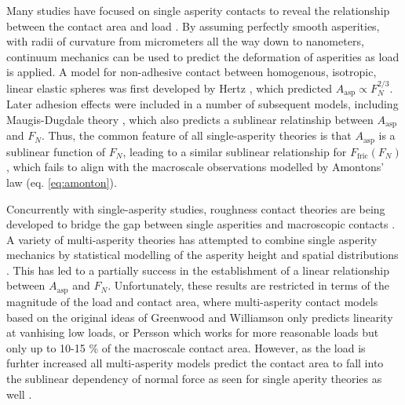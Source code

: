 Many studies have focused on single asperity contacts to reveal the relationship
between the contact area and load
\cite{Szlufarska_2008}\cite{PhysRevLett.56.930}\cite{perry_scanning_2004}. By
assuming perfectly smooth asperities, with radii of curvature from micrometers
all the way down to nanometers, continuum mechanics can be used to predict the
deformation of asperities as load is applied. A model for non-adhesive contact
between homogenous, isotropic, linear elastic spheres was first developed by
Hertz \cite{HertzOnTC}, which predicted $A_{\text{asp}} \propto F_N^{2/3}$.
Later adhesion effects were included in a number of subsequent models, including
Maugis-Dugdale theory \cite{MAUGIS1992243}, which also predicts a sublinear
relatinship between $A_{\text{asp}}$ and $F_N$. Thus, the common feature of all
single-asperity theories is that $A_{\text{asp}}$ is a sublinear function of
$F_N$, leading to a similar sublinear relationship for $F_\text{fric}(F_N)$,
which fails to align with the macroscale observations modelled by Amontons’ law
(eq. \eqref{eq:amonton}).


Concurrently with single-asperity studies, roughness contact theories are being developed \cite{PhysRevLett.100.055504}\cite{Persson}\cite{GW}\cite{BUSH197587} to bridge the gap between single asperities and macroscopic contacts \cite{mo_friction_2009}. A variety of multi-asperity theories has attempted to combine single asperity
mechanics by statistical modelling of the asperity height and spatial
distributions \cite{CARBONE20082555}. This has led to a partially success in the establishment of a linear relationship between $A_{\text{asp}}$ and $F_N$. Unfortunately, these results are restricted
in terms of the magnitude of the load and contact area, where multi-asperity
contact models based on the original ideas of Greenwood and Williamson \cite{GW}
only predicts linearity at vanhising low loads, or Persson \cite{Persson} which
works for more reasonable loads but only up to 10-15 \% of the macroscale
contact area. However, as the load is furhter increased all multi-asperity models
predict the contact area to fall into the sublinear dependency of normal force
as seen for single aperity theories as well \cite{CARBONE20082555}.




